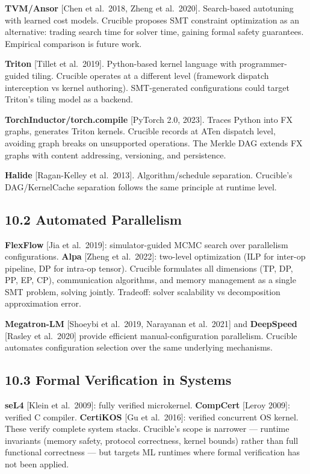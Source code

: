 \textbf{TVM/Ansor} {[}Chen et al.~2018, Zheng et al.~2020{]}. Search-based autotuning with learned cost models. Crucible proposes SMT constraint optimization as an alternative: trading search time for solver time, gaining formal safety guarantees. Empirical comparison is future work.

\textbf{Triton} {[}Tillet et al.~2019{]}. Python-based kernel language with programmer-guided tiling. Crucible operates at a different level (framework dispatch interception vs kernel authoring). SMT-generated configurations could target Triton's tiling model as a backend.

\textbf{TorchInductor/torch.compile} {[}PyTorch 2.0, 2023{]}. Traces Python into FX graphs, generates Triton kernels. Crucible records at ATen dispatch level, avoiding graph breaks on unsupported operations. The Merkle DAG extends FX graphs with content addressing, versioning, and persistence.

\textbf{Halide} {[}Ragan-Kelley et al.~2013{]}. Algorithm/schedule separation. Crucible's DAG/KernelCache separation follows the same principle at runtime level.

\subsection{10.2 Automated Parallelism}\label{automated-parallelism}

\textbf{FlexFlow} {[}Jia et al.~2019{]}: simulator-guided MCMC search over parallelism configurations. \textbf{Alpa} {[}Zheng et al.~2022{]}: two-level optimization (ILP for inter-op pipeline, DP for intra-op tensor). Crucible formulates all dimensions (TP, DP, PP, EP, CP), communication algorithms, and memory management as a single SMT problem, solving jointly. Tradeoff: solver scalability vs decomposition approximation error.

\textbf{Megatron-LM} {[}Shoeybi et al.~2019, Narayanan et al.~2021{]} and \textbf{DeepSpeed} {[}Rasley et al.~2020{]} provide efficient manual-configuration parallelism. Crucible automates configuration selection over the same underlying mechanisms.

\subsection{10.3 Formal Verification in Systems}\label{formal-verification-in-systems}

\textbf{seL4} {[}Klein et al.~2009{]}: fully verified microkernel. \textbf{CompCert} {[}Leroy 2009{]}: verified C compiler. \textbf{CertiKOS} {[}Gu et al.~2016{]}: verified concurrent OS kernel. These verify complete system stacks. Crucible's scope is narrower --- runtime invariants (memory safety, protocol correctness, kernel bounds) rather than full functional correctness --- but targets ML runtimes where formal verification has not been applied.

